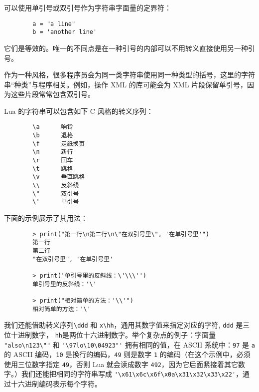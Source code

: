 {\normalsize{}
\vspace{1em}

可以使用单引号或双引号作为字符串字面量的定界符：
\begin{verbatim}
        a = "a line"
        b = 'another line'
\end{verbatim}
它们是等效的。唯一的不同点是在一种引号的内部可以不用转义直接使用另一种引号。

作为一种风格，很多程序员会为同一类字符串使用同一种类型的括号，这里的字符串“种类”与程序相关。例如，操作 XML 的库可能会为 XML 片段保留单引号，因为这些片段常常包含双引号。

Lua 的字符串可以包含如下 C 风格的转义序列：

\begin{verbatim}
        \a      响铃
        \b      退格
        \f      走纸换页
        \n      新行
        \r      回车
        \t      跳格
        \v      垂直跳格
        \\      反斜线
        \"      双引号
        \'      单引号
\end{verbatim}

下面的示例展示了其用法：

\begin{verbatim}
        > print("第一行\n第二行\n\"在双引号里\", '在单引号里'")
        第一行
        第二行
        "在双引号里", '在单引号里'
        
        > print('单引号里的反斜线：\'\\\'')
        单引号里的反斜线：'\'

        > print("相对简单的方法：'\\'")
        相对简单的方法：'\'
\end{verbatim}

我们还能借助转义序列\verb|\ddd| 和 \verb|x\hh|，通用其数字值来指定对应的字符, \verb|ddd| 是三位十进制数字， \verb|hh|是两位十六进制数字。举个复杂点的例子：字面量 \verb|"also\n123\""| 和 \verb|'\97lo\10\04923"'| 拥有相同的值，在 ASCII 系统中：\verb|97| 是 \verb|a| 的 ASCII 编码，\verb|10| 是换行的编码，\verb|49| 则是数字 \verb|1| 的编码（在这个示例中，必须使用三位数字指定 \verb|49|，否则 Lua 就会读成数字 \verb|492|，因为它后面紧接着其它数字。）我们还能把相同的字符串写成 \verb|'\x61\x6c\x6f\x0a\x31\x32\x33\x22'|，通过十六进制编码表示每个字符。

\vspace{1em}
{\normalsize{}
\vspace{1em}

}}
